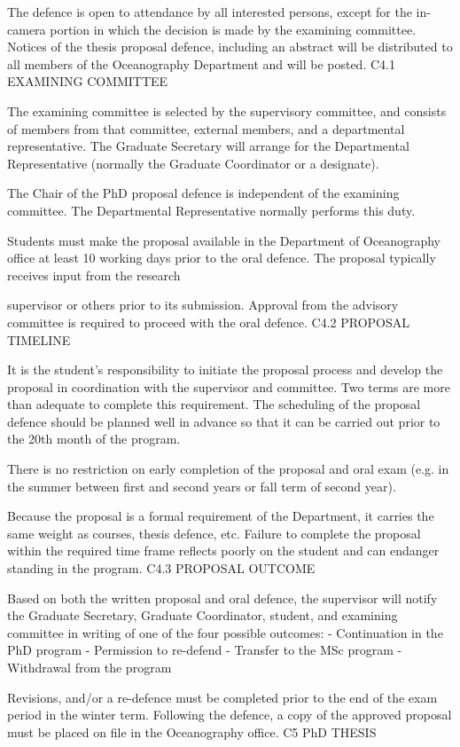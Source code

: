 The defence is open to attendance by all interested persons, except for the in-camera portion in which the decision is made by the examining committee. Notices of the thesis proposal defence, including an abstract will be distributed to all members of the Oceanography Department and will be posted.
C4.1	EXAMINING COMMITTEE

The examining committee is selected by the supervisory committee, and consists of members from that committee, external members, and a departmental representative. The Graduate Secretary will arrange for the Departmental Representative (normally the Graduate Coordinator or a designate).

The Chair of the PhD proposal defence is independent of the examining committee. The Departmental Representative normally performs this duty.

Students must make the proposal available in the Department of Oceanography office at least 10 working days prior to the oral defence.  The proposal typically receives input from the research
 

supervisor or others prior to its submission. Approval from the advisory committee is required to proceed with the oral defence.
C4.2	PROPOSAL TIMELINE

It is the student's responsibility to initiate the proposal process and develop the proposal in coordination with the supervisor and committee. Two terms are more than adequate to complete this requirement. The scheduling of the proposal defence should be planned well in advance so that it can be carried out prior to the 20th month of the program.

There is no restriction on early completion of the proposal and oral exam (e.g. in the summer between first and second years or fall term of second year).

Because the proposal is a formal requirement of the Department, it carries the same weight as courses, thesis defence, etc. Failure to complete the proposal within the required time frame reflects poorly on the student and can endanger standing in the program.
C4.3	PROPOSAL OUTCOME

Based on both the written proposal and oral defence, the supervisor will notify the Graduate Secretary, Graduate Coordinator, student, and examining committee in writing of one of the four possible outcomes:
-	Continuation in the PhD program
-	Permission to re-defend
-	Transfer to the MSc program
-	Withdrawal from the program

Revisions, and/or a re-defence must be completed prior to the end of the exam period in the winter term. Following the defence, a copy of the approved proposal must be placed on file in the Oceanography office.
C5	PhD THESIS

